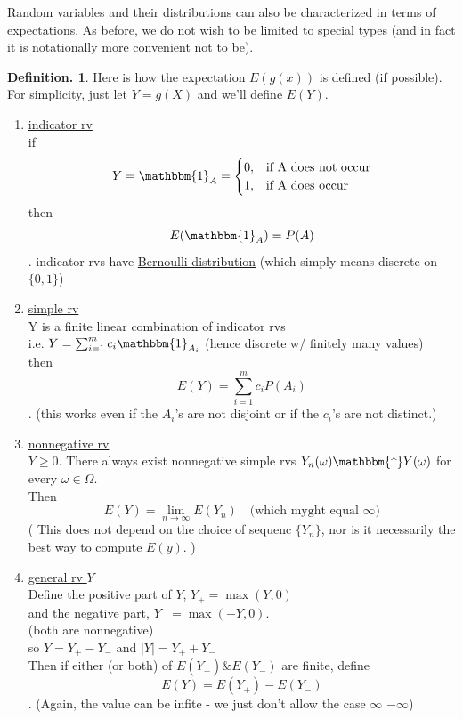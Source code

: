\documentclass[12pt]{article}
\theoremstyle{definition}
\newtheorem{mydef}{Definition.}[section]
\theoremstyle{plain}
\begin{document}
Random variables and their distributions can also be characterized in terms of expectations. As before, we do not wish to be limited to special types (and in fact it is notationally more convenient not to be).

\begin{mydef}
Here is how the expectation $E(g(x))$ is defined (if possible).\\
For simplicity, just let $Y = g(X)$ and we'll define $E(Y)$.
\begin{enumerate}
\item \underline{indicator rv} \\ 

if 
\begin{displaymath}
Y = \mathbbm{1}_A = \begin{cases}
0, & \text{if A does not occur} \\
1, & \text{if A does occur}
\end{cases}
\end{displaymath}
then \[E(\mathbbm{1}_A) = P(A)\]. indicator rvs have \underline{Bernoulli distribution} (which simply means discrete on $\{0,1\}$)

\item \underline{simple rv} \\
Y is a finite linear combination of indicator rvs \\
i.e. $Y = \sum_{i=1}^m c_i \mathbbm{1}_{A_i}$ (hence discrete w/ finitely many values) \\
 then \[E(Y) = \sum_{i=1}^m c_i P(A_i)\]. (this works even if the $A_i$'s are not disjoint or if the $c_i$'s are not distinct.)
 
 \item \underline{nonnegative rv} \\ 
  $Y \geq 0$. There always exist nonnegative simple rvs $Y_n(\omega) \mathbbm{\uparrow} Y(\omega)$ for every $\omega \in \Omega$. \\
 Then \[E(Y) = \lim \limits_{n \rightarrow \infty} E(Y_n) \quad  \text{(which myght equal $\infty$)}\] 
 ( This does not depend on the choice of sequenc $\{Y_n\}$, nor is it necessarily the best way to \underline{compute} $E(y)$. )

\item \underline{general rv $Y$} \\
Define the positive part of $Y$, $Y_+ = \max(Y,0)$\\
and the negative part, $Y_- = \max(-Y, 0)$. \\
(both are nonnegative) \\
so $Y = Y_+ - Y_-$ and $|Y| = Y_+ + Y_-$\\
Then if either (or both) of $E(Y_+) \& E(Y_-)$ are finite, define \[E(Y) = E(Y_+)-E(Y_-)\]. (Again, the value can be infite - we just don't allow the case $\infty$ $-\infty$)
\end{enumerate}
\end{mydef}
\end{document}
